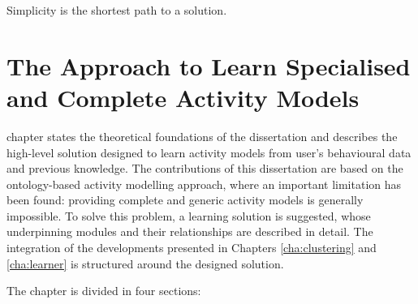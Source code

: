 

\begin{savequote}[50mm]
Simplicity is the shortest path to a solution.
\end{savequote}


\chapter{The Approach to Learn Specialised and Complete Activity Models}
\label{cha:archi}

\ifpdf
    \graphicspath{{3_approach_to_learning_eam/figures/PDF/}{3_approach_to_learning_eam/figures/PNG/}{3_approach_to_learning_eam/figures/}}
\else
    \graphicspath{{3_approach_to_learning_eam/figures/EPS/}{3_approach_to_learning_eam/figures/}}
\fi

 chapter states the theoretical foundations of the dissertation and describes the high-level solution designed to learn activity models from user's behavioural data and previous knowledge. The contributions of this dissertation are based on the ontology-based activity modelling approach, where an important limitation has been found: providing complete and generic activity models is generally impossible. To solve this problem, a learning solution is suggested, whose underpinning modules and their relationships are described in detail. The integration of the developments presented in Chapters \ref{cha:clustering} and \ref{cha:learner} is structured around the designed solution.


The chapter is divided in four sections:

